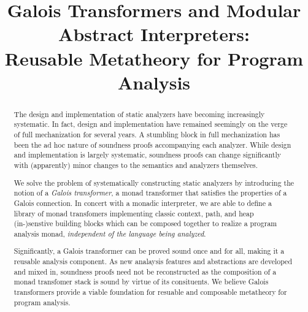 \documentclass[pldi,nocopyrightspace]{sigplanconf}
\begin{document}
\setlength{\abovedisplayskip}{0em}
\setlength{\belowdisplayskip}{0em}
\setlength{\abovedisplayshortskip}{0em}
\setlength{\belowdisplayshortskip}{0em}

\title{Galois Transformers and Modular Abstract Interpreters:\\ Reusable Metatheory for Program Analysis}
\maketitle

\begin{abstract}

The design and implementation of static analyzers have becoming
increasingly systematic.  In fact, design and implementation have
remained seemingly on the verge of full mechanization for several
years.  A stumbling block in full mechanization has been the ad hoc
nature of soundness proofs accompanying each analyzer.  While design
and implementation is largely systematic, soundness proofs can change
significantly with (apparently) minor changes to the semantics and
analyzers themselves.

\par We solve the problem of systematically constructing static
analyzers by introducing the notion of a \emph{Galois transformer}, a
monad transformer that satisfies the properties of a Galois
connection.  In concert with a monadic interpreter, we are able to
define a library of monad transfomers implementing classic context,
path, and heap (in-)senstive building blocks which can be composed
together to realize a program analysis monad, \emph{independent of the
  language being analyzed}.

\par Significantly, a Galois transformer can be proved sound once and
for all, making it a reusable analysis component.  As new analaysis
features and abstractions are developed and mixed in, soundness proofs
need not be reconstructed as the composition of a monad transfomer
stack is sound by virtue of its consituents.  We believe Galois
transformers provide a viable foundation for resuable and composable 
metatheory for program analysis.
\end{abstract}





\end{document}
